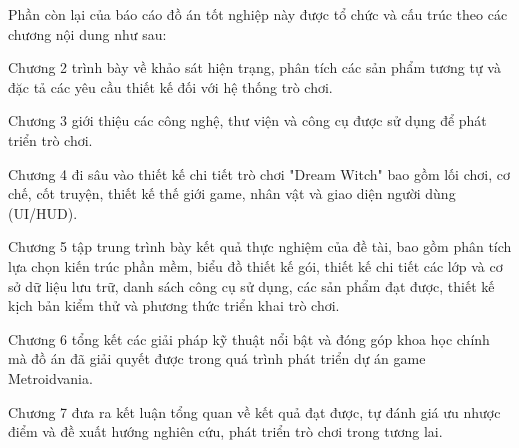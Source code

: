 \documentclass[../DoAn.tex]{subfiles}
\begin{document}
Phần còn lại của báo cáo đồ án tốt nghiệp này được tổ chức và cấu trúc theo các chương nội dung như sau:

Chương 2 trình bày về khảo sát hiện trạng, phân tích các sản phẩm tương tự và đặc tả các yêu cầu thiết kế đối với hệ thống trò chơi.

Chương 3 giới thiệu các công nghệ, thư viện và công cụ được sử dụng để phát triển trò chơi.

Chương 4 đi sâu vào thiết kế chi tiết trò chơi "Dream Witch" bao gồm lối chơi, cơ chế, cốt truyện, thiết kế thế giới game, nhân vật và giao diện người dùng (UI/HUD).

Chương 5 tập trung trình bày kết quả thực nghiệm của đề tài, bao gồm phân tích lựa chọn kiến trúc phần mềm, biểu đồ thiết kế gói, thiết kế chi tiết các lớp và cơ sở dữ liệu lưu trữ, danh sách công cụ sử dụng, các sản phẩm đạt được, thiết kế kịch bản kiểm thử và phương thức triển khai trò chơi.

Chương 6 tổng kết các giải pháp kỹ thuật nổi bật và đóng góp khoa học chính mà đồ án đã giải quyết được trong quá trình phát triển dự án game Metroidvania.

Chương 7 đưa ra kết luận tổng quan về kết quả đạt được, tự đánh giá ưu nhược điểm và đề xuất hướng nghiên cứu, phát triển trò chơi trong tương lai.
\end{document}
